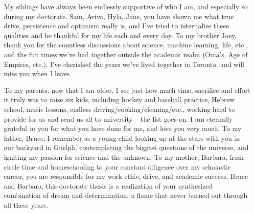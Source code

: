 \documentclass[letterpaper]{ut-thesis} %
\begin{document}
\begin{preliminary}
\begin{acknowledgements}
My siblings have always been endlessly supportive of who I am, and especially so during my doctorate.
Sam, Aviva, Hyla, Jane, you have shown me what true drive, persistence and optimism really is, and I've tried to internalize these qualities and be thankful for my life each and every day. 
To my brother Joey, thank you for the countless discussions about science, machine learning, life, etc., and the fun times we've had together outside the academic realm (Oma's, Age of Empires, etc.). 
I've cherished the years we've lived together in Toronto, and will miss you when I leave. 

To my parents, now that I am older, I see just how much time, sacrifice and effort it truly was to raise six kids, including hockey and baseball practice, Hebrew school, music lessons, endless driving/cooking/cleaning/etc., working hard to provide for us and send us all to university -- the list goes on. 
I am eternally grateful to you for what you have done for me, and love you very much. 
To my father, Bruce, I remember as a young child looking up at the stars with you in our backyard in Guelph, contemplating the biggest questions of the universe, and igniting my passion for science and the unknown.
To my mother, Barbara, from circle time and homeschooling to your constant diligence over my scholastic career, you are responsible for my work ethic, drive, and academic success.
Bruce and Barbara, this doctorate thesis is a realization of your synthesized combination of dream and determination; a flame that never burned out through all these years. 

\end{acknowledgements}

\tableofcontents

\listoftables

\listoffigures

\end{preliminary}

\end{document}
